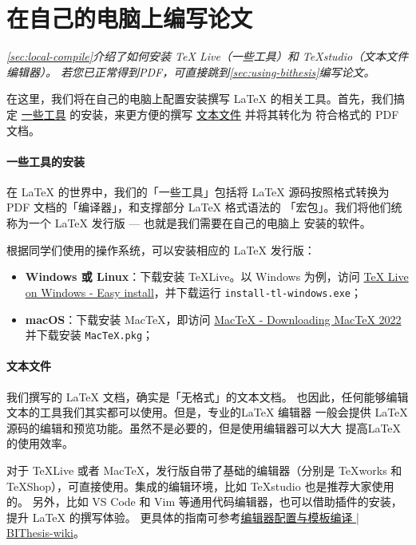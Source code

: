 \section{在自己的电脑上编写论文}

\textit{
\autoref{sec:local-compile}介绍了如何安装 TeX Live（一些工具）和 TeXstudio（文本文件编辑器）。
若您已正常得到PDF，可直接跳到\autoref{sec:using-bithesis}编写论文。
}

在这里，我们将在自己的电脑上配置安装撰写 \LaTeX{} 的相关工具。首先，我们搞定
\underline{一些工具} 的安装，来更方便的撰写 \underline{文本文件} 并将其转化为
符合格式的 PDF 文档。

\paragraph{一些工具的安装} 在 \LaTeX{} 的世界中，我们的「一些工具」包括将
\LaTeX{} 源码按照格式转换为 PDF 文档的「编译器」，和支撑部分 \LaTeX{} 格式语法的
「宏包」。我们将他们统称为一个 \LaTeX{} 发行版 --- 也就是我们需要在自己的电脑上
安装的软件。

根据同学们使用的操作系统，可以安装相应的 \LaTeX{} 发行版：

\begin{itemize}[noitemsep]
  \item \textbf{Windows 或 Linux}：下载安装 \TeX{}Live。以 Windows 为例，访问
  \href{https://www.tug.org/texlive/windows.html}{TeX Live on Windows - Easy
  install}，并下载运行 \texttt{install-tl-windows.exe}；
  \item \textbf{macOS}：下载安装 Mac\TeX{}，即访问
  \href{https://www.tug.org/mactex/mactex-download.html}{MacTeX - Downloading
  MacTeX 2022} 并下载安装 \texttt{MacTeX.pkg}；
\end{itemize}

\paragraph{文本文件} 我们撰写的 \LaTeX{} 文档，确实是「无格式」的文本文档。
也因此，任何能够编辑文本的工具我们其实都可以使用。但是，专业的\LaTeX{} 编辑器
一般会提供 \LaTeX{} 源码的编辑和预览功能。虽然不是必要的，但是使用编辑器可以大大
提高\LaTeX{} 的使用效率。

对于 \TeX{}Live 或者 Mac\TeX，发行版自带了基础的编辑器（分别是 \TeX{}works 和
\TeX{}Shop），可直接使用。集成的编辑环境，比如 \TeX{}studio 也是推荐大家使用的。
另外，比如 VS Code 和 Vim 等通用代码编辑器，也可以借助插件的安装，提升 \LaTeX{}
的撰写体验。
更具体的指南可参考\href{https://bithesis.bitnp.net/guide/configure-and-compile.html}{编辑器配置与模板编译 | BIThesis-wiki}。

